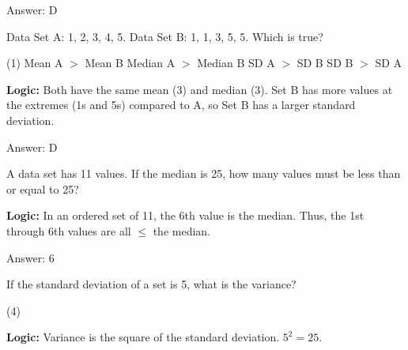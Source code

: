 \documentclass[11pt,paper=a4,answers]{exam}
\begin{document}
\begin{questions}
\begin{solution}
\vspace{30pt}

Answer: \colorbox{yellow!100}{D}
\end{solution}

\vspace{60pt}

\question
Data Set A: {1, 2, 3, 4, 5}. Data Set B: {1, 1, 3, 5, 5}. Which is true?
\begin{tasks}(1)
    \task Mean A $>$ Mean B
    \task Median A $>$ Median B
    \task SD A $>$ SD B
    \task SD B $>$ SD A
\end{tasks}

\begin{solution}
\textbf{Logic:} Both have the same mean (3) and median (3). Set B has more values at the extremes (1s and 5s) compared to A, so Set B has a larger standard deviation.

\vspace{30pt}

Answer: \colorbox{yellow!100}{D}
\end{solution}

\vspace{60pt}

\question
A data set has 11 values. If the median is 25, how many values must be less than or equal to 25?

\begin{solution}
\textbf{Logic:} In an ordered set of 11, the 6th value is the median. Thus, the 1st through 6th values are all $\le$ the median.

\vspace{30pt}

Answer: \colorbox{yellow!100}{6}
\end{solution}

\vspace{60pt}

\question
If the standard deviation of a set is 5, what is the variance?
\begin{tasks}(4)
\end{tasks}

\begin{solution}
\textbf{Logic:} Variance is the square of the standard deviation. $5^2 = 25$.


\end{solution}
\end{questions}
\end{document}
